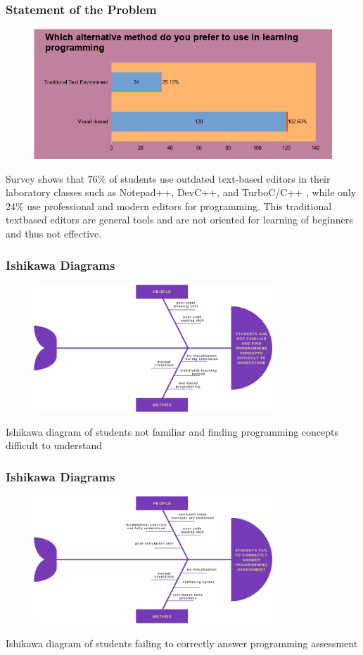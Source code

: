 \documentclass[handout]{beamer}
\newcommand{\parx}{
	\setlength{\parindent}{4em}
	\par}
\begin{document}
\begin{frame}
	\frametitle{Statement of the Problem}
	\begin{figure}
		\includegraphics[scale=0.25]{results/10.png}
	\end{figure}

	\justifying
	\parx
	Survey shows that 76\% of students use outdated text-based editors in their
	laboratory classes such as Notepad++, DevC++, and TurboC/C++ , while only
	24\% use professional and modern editors for programming. This traditional
	textbased editors are general tools and are not oriented for learning of
	beginners and thus not effective.
\end{frame}

\begin{frame}
	\frametitle{Ishikawa Diagrams}
	\begin{figure}
		\includegraphics[width=0.8\textwidth]{figures/fishbone1.png}
	\end{figure}
	\centering
	Ishikawa diagram of students not familiar and finding programming concepts
	difficult to understand
\end{frame}

\begin{frame}
	\frametitle{Ishikawa Diagrams}
	\begin{figure}
		\includegraphics[width=0.8\textwidth]{figures/fishbone2.png}
	\end{figure}
	\centering
	Ishikawa diagram of students failing to correctly answer programming
	assessment
\end{frame}
\end{document}
